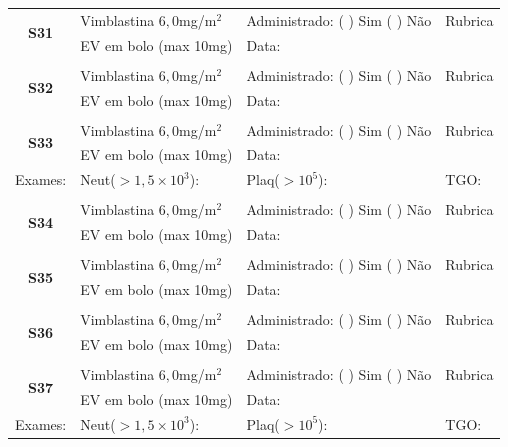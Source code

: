 \documentclass[11pt,a4paper,oldfontcommands]{memoir}
\begin{document}
\begin{center}
\begin{table}[H]
\begin{tabular}{p{}p{}|p{}|p{3cm}}
    \hline
    \multicolumn{1}{c|}{\multirow{2}{*}{\textbf{S31}}}&{Vimblastina \(6,0\)mg/m\(^2\)}&{Administrado: (  ) Sim (  ) Não}&{Rubrica}\\
    \multicolumn{1}{c|}{}&{EV em bolo (max 10mg)}&{Data:}&\\
    \hline
   \\
    \hline
    \multicolumn{1}{c|}{\multirow{2}{*}{\textbf{S32}}}&{Vimblastina \(6,0\)mg/m\(^2\)}&{Administrado: (  ) Sim (  ) Não}&{Rubrica}\\
    \multicolumn{1}{c|}{}&{EV em bolo (max 10mg)}&{Data:}&\\
    \hline
    \\
    \hline
    \multicolumn{1}{c|}{\multirow{2}{*}{\textbf{S33}}}&{Vimblastina \(6,0\)mg/m\(^2\)}&{Administrado: (  ) Sim (  ) Não}&{Rubrica}\\
    \multicolumn{1}{c|}{}&{EV em bolo (max 10mg)}&{Data:}&\\
    \hline
    {Exames:}&{Neut(\(>1,5\times10^3\)):}&{Plaq(\(>10^5\)):}&{TGO:}
    \\
    \hline
    \\
    \hline
    \multicolumn{1}{c|}{\multirow{2}{*}{\textbf{S34}}}&{Vimblastina \(6,0\)mg/m\(^2\)}&{Administrado: (  ) Sim (  ) Não}&{Rubrica}\\
    \multicolumn{1}{c|}{}&{EV em bolo (max 10mg)}&{Data:}&\\
    \hline
    \\
    \hline
    \multicolumn{1}{c|}{\multirow{2}{*}{\textbf{S35}}}&{Vimblastina \(6,0\)mg/m\(^2\)}&{Administrado: (  ) Sim (  ) Não}&{Rubrica}\\
    \multicolumn{1}{c|}{}&{EV em bolo (max 10mg)}&{Data:}&\\
    \hline
    \\
    \hline
    \multicolumn{1}{c|}{\multirow{2}{*}{\textbf{S36}}}&{Vimblastina \(6,0\)mg/m\(^2\)}&{Administrado: (  ) Sim (  ) Não}&{Rubrica}\\
    \multicolumn{1}{c|}{}&{EV em bolo (max 10mg)}&{Data:}&\\
    \hline
    \\
        \hline
    \multicolumn{1}{c|}{\multirow{2}{*}{\textbf{S37}}}&{Vimblastina \(6,0\)mg/m\(^2\)}&{Administrado: (  ) Sim (  ) Não}&{Rubrica}\\
    \multicolumn{1}{c|}{}&{EV em bolo (max 10mg)}&{Data:}&\\
    \hline
    {Exames:}&{Neut(\(>1,5\times10^3\)):}&{Plaq(\(>10^5\)):}&{TGO:}
    \\
    \hline

\end{tabular}
\end{table}
\end{center}
\end{document}
